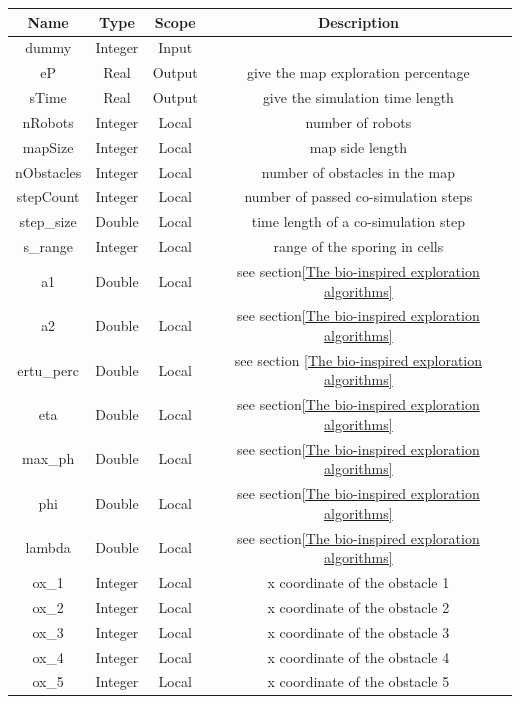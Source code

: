 \documentclass[english]{article}
\begin{document}
\begin{longtable}{|c|c|c|c|}
	\hline
	\textbf{Name} & 
	\textbf{Type} & 
	\textbf{Scope} &
	\textbf{Description} \\ \hline
	\endfirsthead
	\endhead
	dummy & Integer & Input & \\ \hline
	eP & Real & Output & give the map exploration percentage\\ \hline
	sTime & Real & Output & give the simulation time length\\ \hline
	nRobots & Integer & Local & number of robots\\ \hline
	mapSize & Integer & Local & map side length \\ \hline 
	nObstacles & Integer & Local & number of obstacles in the map \\ \hline
	stepCount & Integer & Local & number of passed co-simulation steps \\ \hline
	step\_size & Double & Local & time length of a co-simulation step \\ \hline
	s\_range & Integer & Local & range of the sporing in cells \\ \hline
	a1 & Double & Local & see section\ref{The bio-inspired exploration algorithms} \\ \hline
	a2 & Double & Local & see section\ref{The bio-inspired exploration algorithms} \\ \hline
	ertu\_perc & Double & Local & see section \ref{The bio-inspired exploration algorithms} \\ \hline
	eta & Double & Local & see section\ref{The bio-inspired exploration algorithms} \\ \hline
	max\_ph & Double & Local & see section\ref{The bio-inspired exploration algorithms} \\ \hline
	phi & Double & Local & see section\ref{The bio-inspired exploration algorithms} \\ \hline
	lambda & Double & Local & see section\ref{The bio-inspired exploration algorithms} \\ \hline
	ox\_1 & Integer & Local & x coordinate of the obstacle 1 \\ \hline
	ox\_2 & Integer & Local & x coordinate of the obstacle 2 \\ \hline
	ox\_3 & Integer & Local & x coordinate of the obstacle 3 \\ \hline
	ox\_4 & Integer & Local & x coordinate of the obstacle 4 \\ \hline
	ox\_5 & Integer & Local & x coordinate of the obstacle 5 \\ \hline

\end{longtable}
\end{document}
